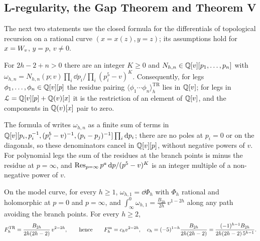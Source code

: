 
\subsection{L-regularity, the Gap Theorem and Theorem V}
\label{sec:mod-Lreg}

The next two statements use the closed formula \cite[Theorem~7.1, (7.9), (7.10)]{ABDKS25} for the differentials of topological recursion on a rational curve $(x=x(z),y=z)$; its assumptions hold for $x=W_{v}$, $y=p$, $v\neq0$.

\begin{thm}
\label{thm:mod-Lreg}
For $2h-2+n>0$ there are an integer $K\geq0$ and $N_{h,n}\in\mathbb{Q}[v][p_1,\dots,p_n]$ with $\omega_{h,n}=N_{h,n}(p;v)\prod_i\dd p_i\big/\prod_i(p_i^5-v)^K$. Consequently, for legs $\phi_1,\dots,\phi_n\in\mathbb{Q}[v][p]$ the residue pairing $\langle\phi_1\cdots\phi_n\rangle^{\mathrm{TR}}_h$ lies in $\mathbb{Q}[v]$; for legs in $\mathcal{L}=\mathbb{Q}[v][p]+\mathbb{Q}(v)[x]$ it is the restriction of an element of $\mathbb{Q}[v]$, and the components in $\mathbb{Q}(v)[x]$ pair to zero.
\end{thm}

\begin{sketch}
The formula of \cite{ABDKS25} writes $\omega_{h,n}$ as a finite sum of terms in $\mathbb{Q}[v][p_i,p_i^{-1},(p_i^5-v)^{-1},(p_i-p_j)^{-1}]\prod_i\mathrm{d} p_i$; there are no poles at $p_i=0$ or on the diagonals, so these denominators cancel in $\mathbb{Q}[v][p]$, without negative powers of $v$. For polynomial legs the sum of the residues at the branch points is minus the residue at $p=\infty$, and $\operatorname*{Res}_{p=\infty}p^a\,\mathrm{d} p/(p^5-v)^K$ is an integer multiple of a non-negative power of $v$.
\end{sketch}

\begin{thm}
\label{thm:mod-gap}
On the model curve, for every $h\geq1$, $\omega_{h,1}=\dd\Phi_h$ with $\Phi_h$ rational and holomorphic at $p=0$ and $p=\infty$, and $\int_\infty^0\omega_{h,1}=\frac{B_{2h}}{2h}\,v^{1-2h}$ along any path avoiding the branch points. For every $h\geq2$,
\[
F^{\mathrm{TR}}_h=\frac{B_{2h}}{2h(2h-2)}\,v^{2-2h},\qquad\text{hence}\qquad F^{\mathrm{m}}_h=c_hv^{2-2h},\quad c_h=(-5)^{1-h}\frac{B_{2h}}{2h(2h-2)}=\frac{(-1)^{h-1}B_{2h}}{2h(2h-2)\,5^{h-1}} .
\]
\end{thm}


